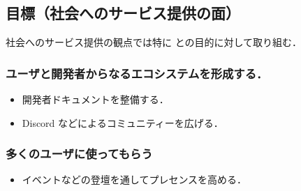 \subsection{目標（社会へのサービス提供の面）}

社会へのサービス提供の観点では特に
との目的に対して取り組む．

\subsubsection{ユーザと開発者からなるエコシステムを形成する．}

\begin{itemize}
  \item 開発者ドキュメントを整備する．
  \item Discord などによるコミュニティーを広げる． %
\end{itemize}

\subsubsection{多くのユーザに使ってもらう}

\begin{itemize}
  \item イベントなどの登壇を通してプレセンスを高める．%
\end{itemize}

